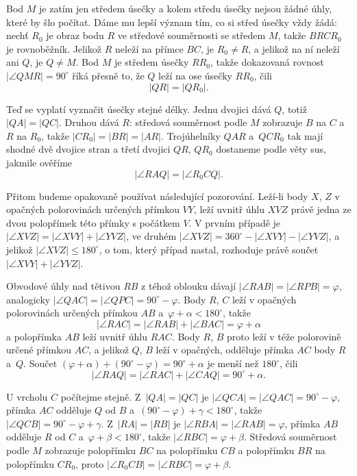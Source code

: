 {    Bod $M$ je zatím jen středem úsečky a kolem středu úsečky nejsou žádné úhly, které by šlo počítat. Dáme mu lepší význam tím, co si střed úsečky vždy žádá: nechť $R_0$ je obraz bodu $R$ ve středové souměrnosti se středem $M$, takže $BRCR_0$ je rovnoběžník. Jelikož $R$ neleží na přímce $BC$, je $R_0 \neq R$, a jelikož na ní neleží ani $Q$, je $Q \neq M$. Bod $M$ je středem úsečky $RR_0$, takže dokazovaná rovnost $|\angle QMR| = 90^\circ$ říká přesně to, že $Q$ leží na ose úsečky $RR_0$, čili
    $$
    |QR| = |QR_0|.
    $$

    Teď se vyplatí vyznačit úsečky stejné délky. Jednu dvojici dává $Q$, totiž $|QA| = |QC|$. Druhou dává $R$: středová souměrnost podle $M$ zobrazuje $B$ na $C$ a~$R$ na $R_0$, takže $|CR_0| = |BR| = |AR|$. Trojúhelníky $QAR$ a~$QCR_0$ tak mají shodné dvě dvojice stran a třetí dvojici $QR$, $QR_0$ dostaneme podle věty sus, jakmile ověříme
    $$
    |\angle RAQ| = |\angle R_0CQ|.
    $$

    Přitom budeme opakovaně používat následující pozorování. Leží-li body $X$, $Z$ v opačných polorovinách určených přímkou $VY$, leží uvnitř úhlu $XVZ$ právě jedna ze dvou polopřímek této přímky s počátkem $V$. V prvním případě je $|\angle XVZ| = |\angle XVY| + |\angle YVZ|$, ve druhém $|\angle XVZ| = 360^\circ - |\angle XVY| - |\angle YVZ|$, a jelikož $|\angle XVZ| \leq 180^\circ$, o tom, který případ nastal, rozhoduje právě součet $|\angle XVY| + |\angle YVZ|$.

    Obvodové úhly nad tětivou $RB$ z téhož oblouku dávají $|\angle RAB| = |\angle RPB| = \varphi$, analogicky $|\angle QAC| = |\angle QPC| = 90^\circ - \varphi$. Body $R$, $C$ leží v opačných polorovinách určených přímkou $AB$ a~$\varphi + \alpha < 180^\circ$, takže
    $$
    |\angle RAC| = |\angle RAB| + |\angle BAC| = \varphi + \alpha
    $$
    a polopřímka $AB$ leží uvnitř úhlu $RAC$. Body $R$, $B$ proto leží v téže polorovině určené přímkou $AC$, a jelikož $Q$, $B$ leží v opačných, odděluje přímka $AC$ body $R$ a~$Q$. Součet $(\varphi + \alpha) + (90^\circ - \varphi) = 90^\circ + \alpha$ je menší než $180^\circ$, čili
    $$
    |\angle RAQ| = |\angle RAC| + |\angle CAQ| = 90^\circ + \alpha.
    $$

    U vrcholu $C$ počítejme stejně. Z~$|QA| = |QC|$ je $|\angle QCA| = |\angle QAC| = 90^\circ - \varphi$, přímka $AC$ odděluje $Q$ od $B$ a~$(90^\circ - \varphi) + \gamma < 180^\circ$, takže $|\angle QCB| = 90^\circ - \varphi + \gamma$. Z~$|RA| = |RB|$ je $|\angle RBA| = |\angle RAB| = \varphi$, přímka $AB$ odděluje $R$ od $C$ a~$\varphi + \beta < 180^\circ$, takže $|\angle RBC| = \varphi + \beta$. Středová souměrnost podle $M$ zobrazuje polopřímku $BC$ na polopřímku $CB$ a polopřímku $BR$ na polopřímku $CR_0$, proto $|\angle R_0CB| = |\angle RBC| = \varphi + \beta$.

}

